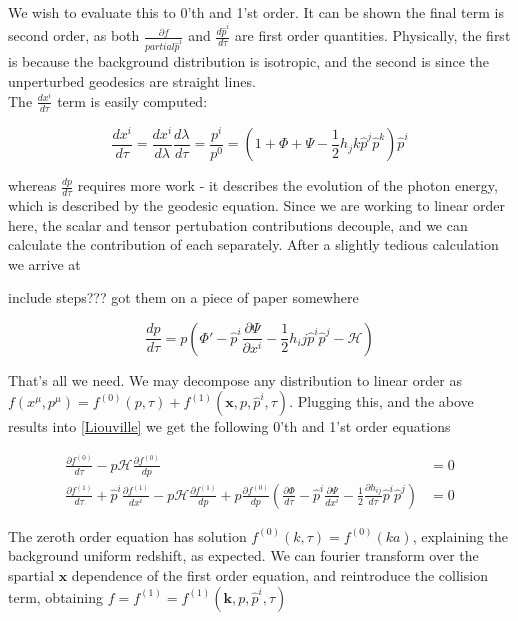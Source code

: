 \documentclass[a4paper,10pt]{article}
\renewcommand{\v}[1]{\mathbf{#1}}
\newcommand{\half}{\frac{1}{2}}
\begin{document}
We wish to evaluate this to 0'th and 1'st order. It can be shown the final term is second order, as both $\frac{\partial f}{partial\hat{p}^i}$ and  $\frac{d\hat{p}^i}{d\tau}$ are first order quantities. Physically, the first is because the background distribution is isotropic, and the second is since the unperturbed geodesics are straight lines. \\

The $\frac{dx^i}{d\tau}$ term is easily computed:

\begin{equation}
\frac{dx^i}{d\tau} = \frac{dx^i}{d\lambda}\frac{d\lambda}{d\tau} = \frac{p^i}{p^0} = (1+\Phi+\Psi-\half h_jk\hat{p}^j\hat{p}^k)\hat{p}^i
\end{equation}

whereas $\frac{dp}{d\tau}$ requires more work - it describes the evolution of the photon energy, which is described by the geodesic equation. Since we are working to linear order here, the scalar and tensor pertubation contributions decouple, and we can calculate the contribution of each separately. After a slightly tedious calculation we arrive at 

include steps??? got them on a piece of paper somewhere

\begin{equation}
\frac{dp}{d\tau} = p (\Phi' - \hat{p}^i\frac{\partial \Psi}{\partial x^i} -\half h_ij\hat{p}^i\hat{p}^j -\mathcal{H})
\end{equation}

That's all we need. We may decompose any distribution to linear order as $f(x^\mu, p^\mu) = f^{(0)}(p,\tau) + f^{(1)}(\v{x},p,\hat{p}^i,\tau)$. Plugging this, and the above results into \ref{Liouville} we get the following 0'th and 1'st order equations

\begin{equation}\begin{split}
\frac{\partial f^{(0)}}{d\tau} - p\mathcal{H}\frac{\partial f^{(0)}}{dp} &=0\\
\frac{\partial f^{(1)}}{d\tau} + \hat{p}^i\frac{\partial f^{(1)}}{dx^i} - p\mathcal{H}\frac{\partial f^{(1)}}{dp} +p\frac{\partial f^{(0)}}{dp}(\frac{\partial\Phi}{d\tau}-\hat{p}^i\frac{\partial \Psi}{dx^i}-\half \frac{\partial h_{ij}}{d\tau}\hat{p}^i\hat{p}^j) &=0
\end{split}\end{equation}

The zeroth order equation has solution $f^{(0)}(k,\tau) = f^{(0)}(ka)$, explaining the background uniform redshift, as expected. We can fourier transform over the spartial $\v{x}$ dependence of the first order equation, and reintroduce the collision term, obtaining $f = f^{(1)} = f^{(1)}(\v{k}, p, \hat{p}^i, \tau)$
\end{document}
